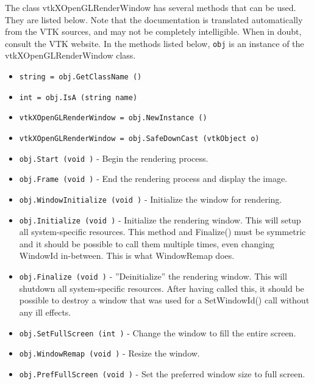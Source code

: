 The class vtkXOpenGLRenderWindow has several methods that can be used.
  They are listed below.
Note that the documentation is translated automatically from the VTK sources,
and may not be completely intelligible.  When in doubt, consult the VTK website.
In the methods listed below, \verb|obj| is an instance of the vtkXOpenGLRenderWindow class.
\begin{itemize}
\item  \verb|string = obj.GetClassName ()|

\item  \verb|int = obj.IsA (string name)|

\item  \verb|vtkXOpenGLRenderWindow = obj.NewInstance ()|

\item  \verb|vtkXOpenGLRenderWindow = obj.SafeDownCast (vtkObject o)|

\item  \verb|obj.Start (void )| -  Begin the rendering process.

\item  \verb|obj.Frame (void )| -  End the rendering process and display the image.

\item  \verb|obj.WindowInitialize (void )| -  Initialize the window for rendering.

\item  \verb|obj.Initialize (void )| -  Initialize the rendering window.  This will setup all system-specific
 resources.  This method and Finalize() must be symmetric and it
 should be possible to call them multiple times, even changing WindowId
 in-between.  This is what WindowRemap does.

\item  \verb|obj.Finalize (void )| -  ''Deinitialize'' the rendering window.  This will shutdown all system-specific
 resources.  After having called this, it should be possible to destroy
 a window that was used for a SetWindowId() call without any ill effects.

\item  \verb|obj.SetFullScreen (int )| -  Change the window to fill the entire screen.

\item  \verb|obj.WindowRemap (void )| -  Resize the window.

\item  \verb|obj.PrefFullScreen (void )| -  Set the preferred window size to full screen.


\end{itemize}
